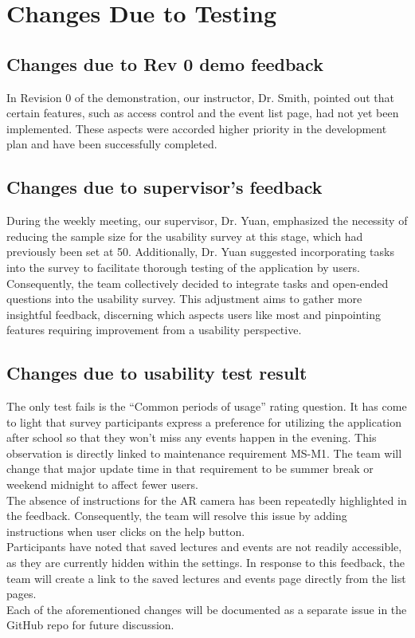\documentclass[12pt, titlepage]{article}
\begin{document}
\section{Changes Due to Testing}
\subsection{Changes due to Rev 0 demo feedback}
In Revision 0 of the demonstration, our instructor, Dr. Smith, pointed out that certain features, such as access control and the event list page, had not yet been implemented. These aspects were accorded higher priority in the development plan and have been successfully completed.

\subsection{Changes due to supervisor's feedback}
During the weekly meeting, our supervisor, Dr. Yuan, emphasized the necessity of reducing the sample size for the usability survey at this stage, which had previously been set at 50. Additionally, Dr. Yuan suggested incorporating tasks into the survey to facilitate thorough testing of the application by users. Consequently, the team collectively decided to integrate tasks and open-ended questions into the usability survey. This adjustment aims to gather more insightful feedback, discerning which aspects users like most and pinpointing features requiring improvement from a usability perspective.
\subsection{Changes due to usability test result}
The only test fails is the ``Common periods of usage'' rating question. It has come to light that survey participants express a preference for utilizing the application after school so that they won't miss any events happen in the evening. This observation is directly linked to maintenance requirement MS-M1. The team will change that major update time in that requirement to be summer break or weekend midnight to affect fewer users.\\
The absence of instructions for the AR camera has been repeatedly highlighted in the feedback. Consequently, the team will resolve this issue by adding instructions when user clicks on the help button. \\
Participants have noted that saved lectures and events are not readily accessible, as they are currently hidden within the settings. In response to this feedback, the team will create a link to the saved lectures and events page directly from the list pages. \\
Each of the aforementioned changes will be documented as a separate issue in the GitHub repo for future discussion.\\
\end{document}
